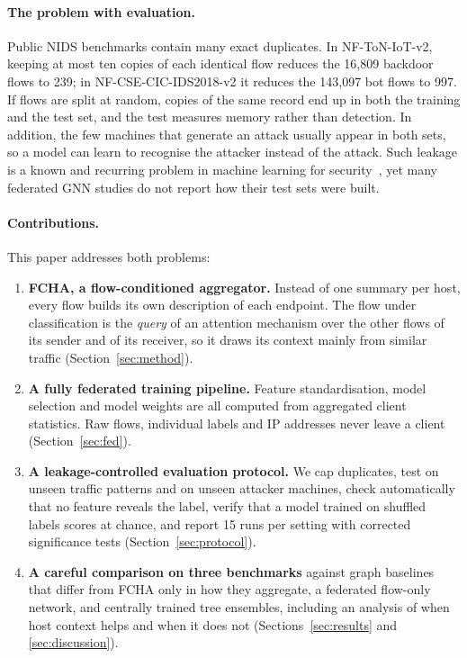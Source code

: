 \documentclass[pdflatex,sn-mathphys-num]{sn-jnl}
\begin{document}
\paragraph{The problem with evaluation.} Public NIDS benchmarks contain many exact duplicates. In NF-ToN-IoT-v2, keeping at most ten copies of each identical flow reduces the 16{,}809 backdoor flows to 239; in NF-CSE-CIC-IDS2018-v2 it reduces the 143{,}097 bot flows to 997. If flows are split at random, copies of the same record end up in both the training and the test set, and the test measures memory rather than detection. In addition, the few machines that generate an attack usually appear in both sets, so a model can learn to recognise the attacker instead of the attack. Such leakage is a known and recurring problem in machine learning for security~\cite{sommer2010closedworld,kaufman2012leakage,arp2022dos,engelen2021troubleshooting}, yet many federated GNN studies do not report how their test sets were built.

\paragraph{Contributions.} This paper addresses both problems:
\begin{enumerate}
\item \textbf{FCHA, a flow-conditioned aggregator.} Instead of one summary per host, every flow builds its own description of each endpoint. The flow under classification is the \emph{query} of an attention mechanism over the other flows of its sender and of its receiver, so it draws its context mainly from similar traffic (Section~\ref{sec:method}).
\item \textbf{A fully federated training pipeline.} Feature standardisation, model selection and model weights are all computed from aggregated client statistics. Raw flows, individual labels and IP addresses never leave a client (Section~\ref{sec:fed}).
\item \textbf{A leakage-controlled evaluation protocol.} We cap duplicates, test on unseen traffic patterns and on unseen attacker machines, check automatically that no feature reveals the label, verify that a model trained on shuffled labels scores at chance, and report 15 runs per setting with corrected significance tests (Section~\ref{sec:protocol}).
\item \textbf{A careful comparison on three benchmarks} against graph baselines that differ from FCHA only in how they aggregate, a federated flow-only network, and centrally trained tree ensembles, including an analysis of when host context helps and when it does not (Sections~\ref{sec:results} and \ref{sec:discussion}).
\end{enumerate}
\end{document}
